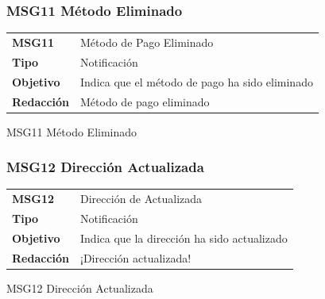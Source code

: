 \documentclass[14pt]{article}
\begin{document}
            \subsubsection{MSG11 Método Eliminado}\label{MSG11 Método Eliminado}
                \begin{table}[H]
                    \begin{center}
                        \begin{tabular}{| l | l | } \hline
                        \textbf{MSG11} & Método de Pago Eliminado \\
                        \textbf{Tipo} & Notificación \\
                        \textbf{Objetivo} & Indica que el método de pago ha sido eliminado \\
                        \textbf{Redacción} & Método de pago eliminado \\  \hline
                        \end{tabular}
                        
                        \vspace{0.3cm} MSG11 Método Eliminado
                    \end{center}
                \end{table}
                
            \subsubsection{MSG12 Dirección Actualizada}\label{MSG12 Dirección Actualizada}
                \begin{table}[H]
                    \begin{center}
                        \begin{tabular}{| l | l | } \hline
                        \textbf{MSG12} & Dirección de Actualizada \\
                        \textbf{Tipo} & Notificación \\
                        \textbf{Objetivo} & Indica que la dirección ha sido actualizado \\
                        \textbf{Redacción} & ¡Dirección actualizada! \\ \hline
                        \end{tabular}
                        
                        \vspace{0.3cm} MSG12 Dirección Actualizada
                    \end{center}
                \end{table}
                
\end{document}
